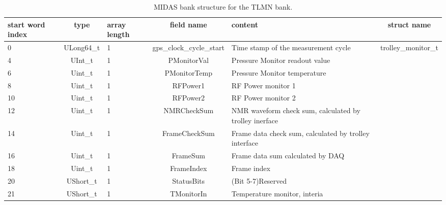 \begin{table}[htbp]
\centering
\caption{MIDAS bank structure for the TLMN bank.}
\begin{tabular}{|p{2cm}|c|p{1.5cm}|c|p{4cm}|c|}
\hline
start word index & type       & array length & field name               & content                                                & struct name \\
\hline
0                & ULong64\_t & 1            & gps\_clock\_cycle\_start & Time stamp of the measurement cycle                    & \multirow{21}{*}{trolley\_monitor\_t}         \\ 
\cline{1-5}
4                & UInt\_t    & 1            & PMonitorVal              & Pressure Monitor readout value                         &                             \\
\cline{1-5}
6                & Uint\_t    & 1            & PMonitorTemp             & Pressure Monitor temperature                           &                             \\
\cline{1-5}
8                & Uint\_t    & 1            & RFPower1                 & RF Power monitor 1                                     &                             \\
\cline{1-5}
10               & Uint\_t    & 1            & RFPower2                 & RF Power monitor 2                                     &                             \\
\cline{1-5}
12               & Uint\_t    & 1            & NMRCheckSum              & NMR waveform check sum, calculated by trolley inerface &                             \\
\cline{1-5}
14               & Uint\_t    & 1            & FrameCheckSum            & Frame data check sum, calculated by trolley interface  &                             \\
\cline{1-5}
16               & Uint\_t    & 1            & FrameSum                 & Frame data sum calculated by DAQ                       &                             \\
\cline{1-5}
18               & Uint\_t    & 1            & FrameIndex               & Frame index                                            &                             \\
\cline{1-5}
20               & UShort\_t  & 1            & StatusBits               & (Bit 5-7)Reserved                                      &                             \\
\cline{1-5}
21               & UShort\_t  & 1            & TMonitorIn               & Temperature monitor, interia                           &                             \\

\end{tabular}
\end{table}
